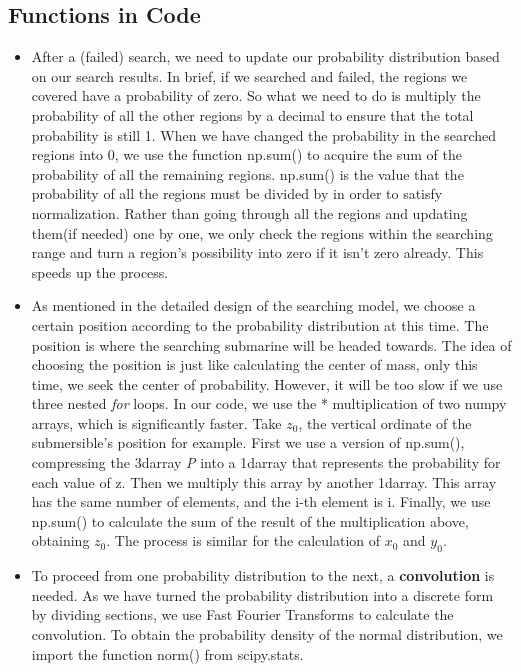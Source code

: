 \documentclass[12pt]{article}
\begin{document}
\subsection{Functions in Code}
\begin{itemize}
    \setlength{\itemsep}{1em}
    \item After a (failed) search, we need to update our probability distribution based on our search results. In brief, if we searched and failed, the regions we covered have a probability of zero. So what we need to do is multiply the probability of all the other regions by a decimal to ensure that the total probability is still 1. When we have changed the probability in the searched regions into 0, we use the function np.sum() to acquire the sum of the probability of all the remaining regions. np.sum() is the value that the probability of all the regions must be divided by in order to satisfy normalization. Rather than going through all the regions and updating them(if needed) one by one, we only check the regions within the searching range and turn a region's possibility into zero if it isn't zero already. This speeds up the process.
    \item As mentioned in the detailed design of the searching model, we choose a certain position according to the probability distribution at this time. The position is where the searching submarine will be headed towards. The idea of choosing the position is just like calculating the center of mass, only this time, we seek the center of probability. However, it will be too slow if we use three nested \textit{for} loops. In our code, we use the * multiplication of two numpy arrays, which is significantly faster. Take $ z_0$, the vertical ordinate of the submersible's position for example. First we use a version of np.sum(), compressing the 3darray \textit{P} into a 1darray that represents the probability for each value of z. Then we multiply this array by another 1darray. This array has the same number of elements, and the i-th element is i. Finally, we use np.sum() to calculate the sum of the result of the multiplication above, obtaining $ z_0$. The process is similar for the calculation of $ x_0 $ and $ y_0$.
    \item To proceed from one probability distribution to the next, a \textbf{convolution} is needed. As we have turned the probability distribution into a discrete form by dividing sections, we use Fast Fourier Transforms to calculate the convolution. To obtain the probability density of the normal distribution, we import the function norm() from \textit{}{scipy.stats}.

\end{itemize}
\end{document}
